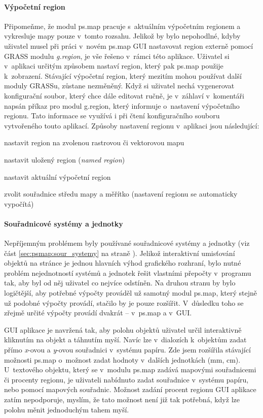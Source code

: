 \documentclass[a4paper,12pt,draft]{article}
\begin{document}
\paragraph*{Výpočetní region} Připomeňme, že modul ps.map
pracuje s~aktuálním výpočet\-ním regionem a vykresluje mapy pouze v~tomto
rozsahu. Jelikož by bylo nepohodlné, kdyby uživatel musel při práci
v~novém ps.map GUI nastavovat region externě pomocí GRASS modulu
\emph{g.region}, je vše řešeno v~rámci této aplikace. Uživatel si
v~aplikaci určitým způsobem nastaví region, který pak ps.map
použije k~zobrazení. Stávající výpočetní region, který mezitím
mohou používat další moduly GRASSu, zůstane nezměněný. Když si
uživatel nechá vygenerovat konfigurační soubor, který chce dále
editovat ručně, je v~záhlaví v~komentáři napsán příkaz pro modul
g.region, který informuje o~nastavení výpočetního regionu.
 Tato informace se využívá i při čtení konfiguračního
souboru vytvořeného touto aplikací.  Způsoby nastavení regionu v~aplikaci jsou
následující:
\begin{enumerate*}
    \item nastavit region na zvolenou rastrovou či vektorovou mapu
    \item nastavit uložený region (\emph{named region})
    \item nastavit aktuální výpočetní region
    \item zvolit souřadnice středu mapy a měřítko (nastavení regionu
    se automaticky vypočítá)
\end{enumerate*}


\paragraph*{Souřadnicové systémy a jednotky} Nepříjemným problémem
byly používané souřadnicové systémy a jednotky (viz část
\ref{sec:psmap:sour_systemy} na straně \pageref{sec:psmap:sour_systemy}).
 Jelikož interaktivní umisťování objektů na stránce je jednou hlavních
 výhod grafického rozhraní, bylo nutné problém nejednotností systémů
 a jednotek řešit vlastními přepočty v~programu tak, aby byl od něj
 uživatel co nejvíce odstíněn. Na druhou stranu by bylo logičtější,
 aby potřebné výpočty prováděl už samotný modul ps.map,
 který stejně už podobné výpočty provádí, stačilo by je pouze
 rozšířit. V~důsledku toho se zřejmě určité výpočty provádí
 dvakrát -- v~ps.map a v~GUI.

 GUI aplikace je navržená tak, aby polohu objektů uživatel určil
 interaktivně kliknutím na objekt a táhnutím myší. Navíc lze
 v~dialozích k~objektům zadat přímo \emph{x}-ovou a \emph{y}-ovou
 souřadnici v~systému papíru. Zde jsem rozšířila stávající možnosti
ps.map o~možnost zadat hodnoty v~dalších jednotkách (mm, cm).
 U~textového objektu, který se v~modulu ps.map zadává mapovými
 souřadnicemi či procenty regionu, je uživateli nabídnuto
 zadat souřadnice v~systému papíru, nebo pomocí mapových
 souřadnic. Možnost zadání procent regionu GUI aplikace zatím nepodporuje,
 myslím, že tato možnost není již tak potřebná, když lze polohu
 měnit jednoduchým tahem myší.
\end{document}
